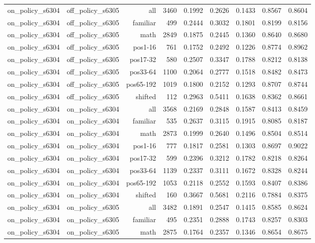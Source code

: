 \begin{tabular}{lrrrrrrrr}
on\_policy\_s6304 & off\_policy\_s6305 & all & 3460 & 0.1992 & 0.2626 & 0.1433 & 0.8567 & 0.8604 \\
on\_policy\_s6304 & off\_policy\_s6305 & familiar & 499 & 0.2444 & 0.3032 & 0.1801 & 0.8199 & 0.8156 \\
on\_policy\_s6304 & off\_policy\_s6305 & math & 2849 & 0.1875 & 0.2445 & 0.1360 & 0.8640 & 0.8680 \\
on\_policy\_s6304 & off\_policy\_s6305 & pos1-16 & 761 & 0.1752 & 0.2492 & 0.1226 & 0.8774 & 0.8962 \\
on\_policy\_s6304 & off\_policy\_s6305 & pos17-32 & 580 & 0.2507 & 0.3347 & 0.1788 & 0.8212 & 0.8138 \\
on\_policy\_s6304 & off\_policy\_s6305 & pos33-64 & 1100 & 0.2064 & 0.2777 & 0.1518 & 0.8482 & 0.8473 \\
on\_policy\_s6304 & off\_policy\_s6305 & pos65-192 & 1019 & 0.1800 & 0.2152 & 0.1293 & 0.8707 & 0.8744 \\
on\_policy\_s6304 & off\_policy\_s6305 & shifted & 112 & 0.2963 & 0.5411 & 0.1638 & 0.8362 & 0.8661 \\
on\_policy\_s6304 & on\_policy\_s6304 & all & 3568 & 0.2169 & 0.2848 & 0.1587 & 0.8413 & 0.8459 \\
on\_policy\_s6304 & on\_policy\_s6304 & familiar & 535 & 0.2637 & 0.3115 & 0.1915 & 0.8085 & 0.8187 \\
on\_policy\_s6304 & on\_policy\_s6304 & math & 2873 & 0.1999 & 0.2640 & 0.1496 & 0.8504 & 0.8514 \\
on\_policy\_s6304 & on\_policy\_s6304 & pos1-16 & 777 & 0.1817 & 0.2581 & 0.1303 & 0.8697 & 0.9022 \\
on\_policy\_s6304 & on\_policy\_s6304 & pos17-32 & 599 & 0.2396 & 0.3212 & 0.1782 & 0.8218 & 0.8264 \\
on\_policy\_s6304 & on\_policy\_s6304 & pos33-64 & 1139 & 0.2337 & 0.3111 & 0.1672 & 0.8328 & 0.8244 \\
on\_policy\_s6304 & on\_policy\_s6304 & pos65-192 & 1053 & 0.2118 & 0.2552 & 0.1593 & 0.8407 & 0.8386 \\
on\_policy\_s6304 & on\_policy\_s6304 & shifted & 160 & 0.3667 & 0.5681 & 0.2116 & 0.7884 & 0.8375 \\
on\_policy\_s6304 & on\_policy\_s6305 & all & 3482 & 0.1891 & 0.2547 & 0.1415 & 0.8585 & 0.8624 \\
on\_policy\_s6304 & on\_policy\_s6305 & familiar & 495 & 0.2351 & 0.2888 & 0.1743 & 0.8257 & 0.8303 \\
on\_policy\_s6304 & on\_policy\_s6305 & math & 2875 & 0.1764 & 0.2357 & 0.1346 & 0.8654 & 0.8675 \\

\end{tabular}

